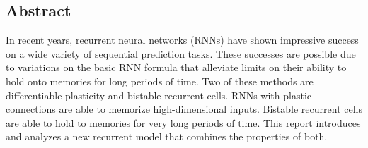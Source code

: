 \begin{center}
	\section*{Abstract}

	In recent years, recurrent neural networks (RNNs) have shown impressive success on a wide variety of sequential prediction tasks. These successes are possible due to variations on the basic RNN formula that alleviate limits on their ability to hold onto memories for long periods of time. Two of these methods are differentiable plasticity and bistable recurrent cells. RNNs with plastic connections are able to memorize high-dimensional inputs. Bistable recurrent cells are able to hold to memories for very long periods of time. This report introduces and analyzes a new recurrent model that combines the properties of both.
\end{center}